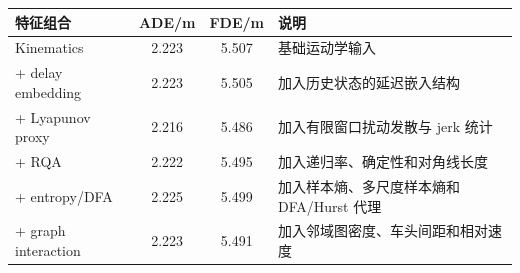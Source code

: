 \begin{tabularx}{\textwidth}{lccX}
\toprule
特征组合 & ADE/m & FDE/m & 说明 \\ 
\midrule
Kinematics & 2.223 & 5.507 & 基础运动学输入 \\ 
+ delay embedding & 2.223 & 5.505 & 加入历史状态的延迟嵌入结构 \\ 
+ Lyapunov proxy & 2.216 & 5.486 & 加入有限窗口扰动发散与 jerk 统计 \\ 
+ RQA & 2.222 & 5.495 & 加入递归率、确定性和对角线长度 \\ 
+ entropy/DFA & 2.225 & 5.499 & 加入样本熵、多尺度样本熵和 DFA/Hurst 代理 \\ 
+ graph interaction & 2.223 & 5.491 & 加入邻域图密度、车头间距和相对速度 \\ 
\bottomrule
\end{tabularx}
